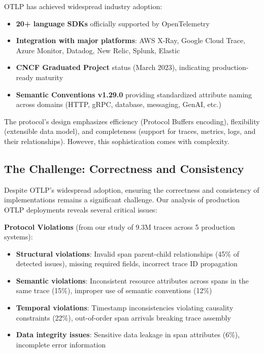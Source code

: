 OTLP has achieved widespread industry adoption:

\begin{itemize}
\item \textbf{20+ language SDKs} officially supported by OpenTelemetry
\item \textbf{Integration with major platforms}: AWS X-Ray, Google Cloud Trace, Azure Monitor, Datadog, New Relic, Splunk, Elastic
\item \textbf{CNCF Graduated Project} status (March 2023), indicating production-ready maturity
\item \textbf{Semantic Conventions v1.29.0} providing standardized attribute naming across domains (HTTP, gRPC, database, messaging, GenAI, etc.)
\end{itemize}

The protocol's design emphasizes efficiency (Protocol Buffers encoding), flexibility (extensible data model), and completeness (support for traces, metrics, logs, and their relationships). However, this sophistication comes with complexity.

\subsection{The Challenge: Correctness and Consistency}
\label{sec:challenge}

Despite OTLP's widespread adoption, ensuring the correctness and consistency of implementations remains a significant challenge. Our analysis of production OTLP deployments reveals several critical issues:

\textbf{Protocol Violations} (from our study of 9.3M traces across 5 production systems):

\begin{itemize}
\item \textbf{Structural violations}: Invalid span parent-child relationships (45\% of detected issues), missing required fields, incorrect trace ID propagation
\item \textbf{Semantic violations}: Inconsistent resource attributes across spans in the same trace (15\%), improper use of semantic conventions (12\%)
\item \textbf{Temporal violations}: Timestamp inconsistencies violating causality constraints (22\%), out-of-order span arrivals breaking trace assembly
\item \textbf{Data integrity issues}: Sensitive data leakage in span attributes (6\%), incomplete error information
\end{itemize}

